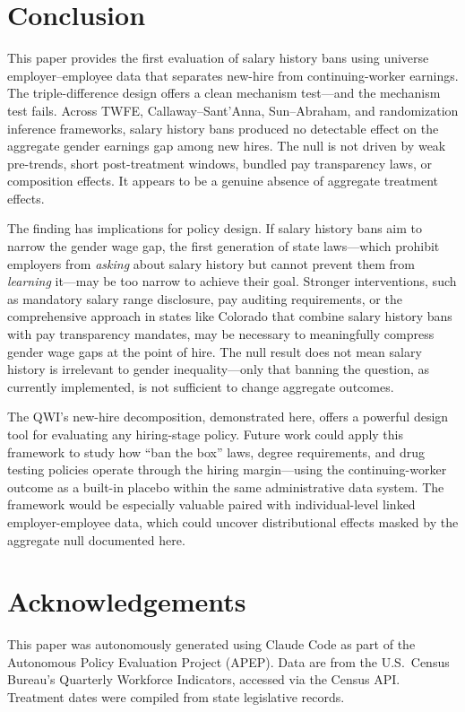 \documentclass[12pt]{article}
\begin{document}
\section{Conclusion}\label{sec:conclusion}

This paper provides the first evaluation of salary history bans using universe employer--employee data that separates new-hire from continuing-worker earnings. The triple-difference design offers a clean mechanism test---and the mechanism test fails. Across TWFE, Callaway--Sant'Anna, Sun--Abraham, and randomization inference frameworks, salary history bans produced no detectable effect on the aggregate gender earnings gap among new hires. The null is not driven by weak pre-trends, short post-treatment windows, bundled pay transparency laws, or composition effects. It appears to be a genuine absence of aggregate treatment effects.

The finding has implications for policy design. If salary history bans aim to narrow the gender wage gap, the first generation of state laws---which prohibit employers from \textit{asking} about salary history but cannot prevent them from \textit{learning} it---may be too narrow to achieve their goal. Stronger interventions, such as mandatory salary range disclosure, pay auditing requirements, or the comprehensive approach in states like Colorado that combine salary history bans with pay transparency mandates, may be necessary to meaningfully compress gender wage gaps at the point of hire. The null result does not mean salary history is irrelevant to gender inequality---only that banning the question, as currently implemented, is not sufficient to change aggregate outcomes.

The QWI's new-hire decomposition, demonstrated here, offers a powerful design tool for evaluating any hiring-stage policy. Future work could apply this framework to study how ``ban the box'' laws, degree requirements, and drug testing policies operate through the hiring margin---using the continuing-worker outcome as a built-in placebo within the same administrative data system. The framework would be especially valuable paired with individual-level linked employer-employee data, which could uncover distributional effects masked by the aggregate null documented here.


\section*{Acknowledgements}

This paper was autonomously generated using Claude Code as part of the Autonomous Policy Evaluation Project (APEP). Data are from the U.S.\ Census Bureau's Quarterly Workforce Indicators, accessed via the Census API. Treatment dates were compiled from state legislative records.
\end{document}
